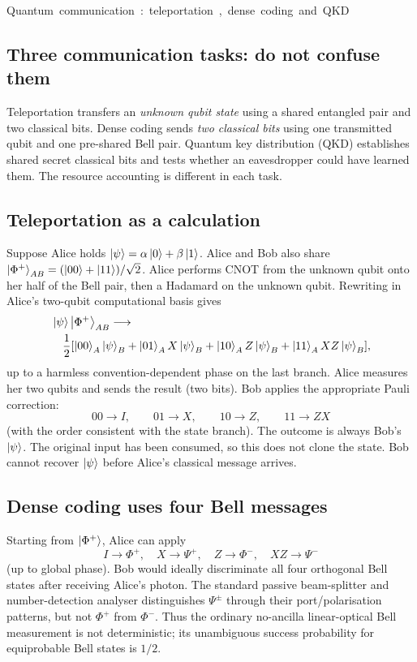 \unit{Quantum communication: teleportation, dense coding and QKD}
\subsection{Three communication tasks: do not confuse them}
Teleportation transfers an \emph{unknown qubit state}
using a shared entangled pair and two classical bits.
Dense coding sends \emph{two classical bits} using
one transmitted qubit and one pre-shared Bell pair.
Quantum key distribution (QKD) establishes shared
secret classical bits and tests whether an
eavesdropper could have learned them.
The resource accounting is different in each task.

\subsection{Teleportation as a calculation}
Suppose Alice holds \(\left\lvert \psi\right\rangle=\alpha\left\lvert 0\right\rangle+\beta\left\lvert 1\right\rangle\).
Alice and Bob also share
\(\left\lvert \Phi^+\right\rangle_{AB}=(\left\lvert 00\right\rangle+\left\lvert 11\right\rangle)/\sqrt2\).
Alice performs CNOT from the unknown qubit
onto her half of the Bell pair, then a Hadamard
on the unknown qubit. Rewriting in Alice's
two-qubit computational basis gives
\[
\begin{aligned}
&\left\lvert \psi\right\rangle\left\lvert \Phi^+\right\rangle_{AB}\longrightarrow\\
&\quad \frac12[
\left\lvert 00\right\rangle_A\left\lvert \psi\right\rangle_B+
\left\lvert 01\right\rangle_A X\left\lvert \psi\right\rangle_B+
\left\lvert 10\right\rangle_A Z\left\lvert \psi\right\rangle_B+
\left\lvert 11\right\rangle_A XZ\left\lvert \psi\right\rangle_B],
\end{aligned}
\]
up to a harmless convention-dependent phase
on the last branch. Alice measures her
two qubits and sends the result (two bits).
Bob applies the appropriate Pauli correction:
\[
00\to I,\qquad01\to X,\qquad10\to Z,
\qquad11\to ZX
\]
(with the order consistent with the state branch).
The outcome is always Bob's \(\left\lvert \psi\right\rangle\).
The original input has been consumed, so
this does not clone the state. Bob cannot
recover \(\left\lvert \psi\right\rangle\) before Alice's classical
message arrives.

\subsection{Dense coding uses four Bell messages}
Starting from \(\left\lvert \Phi^+\right\rangle\), Alice can apply
\[
I\to\Phi^+,\quad X\to\Psi^+,\quad
Z\to\Phi^-,\quad XZ\to\Psi^-
\]
(up to global phase).
Bob would ideally discriminate all four
orthogonal Bell states after receiving Alice's
photon. The standard passive beam-splitter
and number-detection analyser distinguishes
\(\Psi^\pm\) through their port/polarisation
patterns, but not \(\Phi^+\) from \(\Phi^-\).
Thus the ordinary no-ancilla linear-optical
Bell measurement is not deterministic;
its unambiguous success probability for
equiprobable Bell states is \(1/2\).

